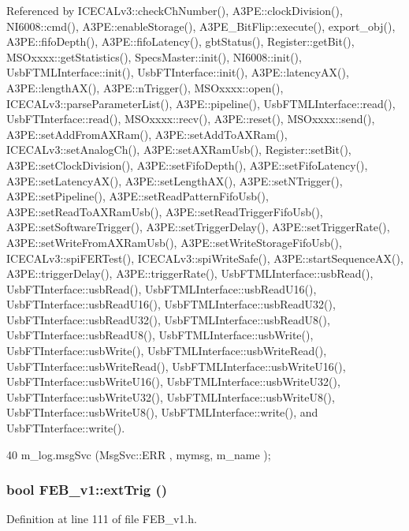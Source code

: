 Referenced by ICECALv3::checkChNumber(), A3PE::clockDivision(), NI6008::cmd(), A3PE::enableStorage(), A3PE\_\-BitFlip::execute(), export\_\-obj(), A3PE::fifoDepth(), A3PE::fifoLatency(), gbtStatus(), Register::getBit(), MSOxxxx::getStatistics(), SpecsMaster::init(), NI6008::init(), UsbFTMLInterface::init(), UsbFTInterface::init(), A3PE::latencyAX(), A3PE::lengthAX(), A3PE::nTrigger(), MSOxxxx::open(), ICECALv3::parseParameterList(), A3PE::pipeline(), UsbFTMLInterface::read(), UsbFTInterface::read(), MSOxxxx::recv(), A3PE::reset(), MSOxxxx::send(), A3PE::setAddFromAXRam(), A3PE::setAddToAXRam(), ICECALv3::setAnalogCh(), A3PE::setAXRamUsb(), Register::setBit(), A3PE::setClockDivision(), A3PE::setFifoDepth(), A3PE::setFifoLatency(), A3PE::setLatencyAX(), A3PE::setLengthAX(), A3PE::setNTrigger(), A3PE::setPipeline(), A3PE::setReadPatternFifoUsb(), A3PE::setReadToAXRamUsb(), A3PE::setReadTriggerFifoUsb(), A3PE::setSoftwareTrigger(), A3PE::setTriggerDelay(), A3PE::setTriggerRate(), A3PE::setWriteFromAXRamUsb(), A3PE::setWriteStorageFifoUsb(), ICECALv3::spiFERTest(), ICECALv3::spiWriteSafe(), A3PE::startSequenceAX(), A3PE::triggerDelay(), A3PE::triggerRate(), UsbFTMLInterface::usbRead(), UsbFTInterface::usbRead(), UsbFTMLInterface::usbReadU16(), UsbFTInterface::usbReadU16(), UsbFTMLInterface::usbReadU32(), UsbFTInterface::usbReadU32(), UsbFTMLInterface::usbReadU8(), UsbFTInterface::usbReadU8(), UsbFTMLInterface::usbWrite(), UsbFTInterface::usbWrite(), UsbFTMLInterface::usbWriteRead(), UsbFTInterface::usbWriteRead(), UsbFTMLInterface::usbWriteU16(), UsbFTInterface::usbWriteU16(), UsbFTMLInterface::usbWriteU32(), UsbFTInterface::usbWriteU32(), UsbFTMLInterface::usbWriteU8(), UsbFTInterface::usbWriteU8(), UsbFTMLInterface::write(), and UsbFTInterface::write().


\begin{DoxyCode}
40 { m_log.msgSvc (MsgSvc::ERR     , mymsg, m_name ); }
\end{DoxyCode}
\hypertarget{classFEB__v1_a481e089490ae958c7606f11d27c9db9a}{
\subsubsection[{extTrig}]{\setlength{\rightskip}{0pt plus 5cm}bool FEB\_\-v1::extTrig ()}}
\label{classFEB__v1_a481e089490ae958c7606f11d27c9db9a}


Definition at line 111 of file FEB\_\-v1.h.

